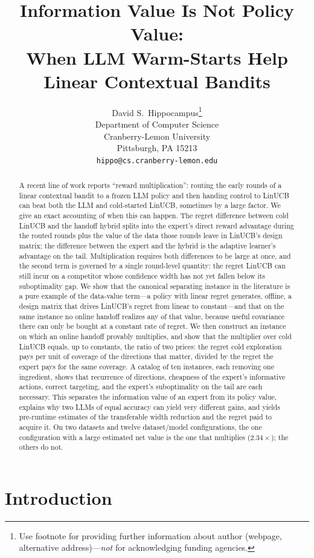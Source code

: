 \documentclass{article}
\title{Information Value Is Not Policy Value:\\ When LLM Warm-Starts Help Linear Contextual Bandits}
\author{%
  David S.~Hippocampus\thanks{Use footnote for providing further information
    about author (webpage, alternative address)---\emph{not} for acknowledging
    funding agencies.} \\
  Department of Computer Science\\
  Cranberry-Lemon University\\
  Pittsburgh, PA 15213 \\
  \texttt{hippo@cs.cranberry-lemon.edu} \\
}
\theoremstyle{definition}
\theoremstyle{remark}
\theoremstyle{remark}
\begin{document}
\maketitle
\begin{abstract}
A recent line of work reports ``reward multiplication'': routing the early
rounds of a linear contextual bandit to a frozen LLM policy and then handing
control to LinUCB can beat both the LLM and cold-started LinUCB, sometimes by a
large factor. We give an exact accounting of when this can happen. The regret
difference between cold LinUCB and the handoff hybrid splits into the expert's
direct reward advantage during the routed rounds plus the value of the data
those rounds leave in LinUCB's design matrix; the difference between the expert
and the hybrid is the adaptive learner's advantage on the tail. Multiplication
requires both differences to be large at once, and the second term is governed
by a single round-level quantity: the regret LinUCB can still incur on a
competitor whose confidence width has not yet fallen below its suboptimality
gap. We show that the canonical separating instance in the literature is a pure
example of the data-value term---a policy with linear regret generates, offline,
a design matrix that drives LinUCB's regret from linear to constant---and that
on the same instance no online handoff realizes any of that value, because
useful covariance there can only be bought at a constant rate of regret. We
then construct an instance on which an online handoff provably multiplies,
and show that the multiplier over cold LinUCB equals, up to constants, the
ratio of two prices: the regret cold exploration pays per unit of coverage
of the directions that matter, divided by the regret the expert pays for the
same coverage. A catalog of ten instances, each removing one ingredient,
shows that recurrence of directions, cheapness of the expert's informative
actions, correct targeting, and the expert's suboptimality on the tail are
each necessary. This separates the information value of an expert from its
policy value, explains
why two LLMs of equal accuracy can yield very different gains, and yields
pre-runtime estimates of the transferable width reduction and the regret paid
to acquire it. On two datasets and twelve dataset/model configurations, the
one configuration with a large estimated net value is the one that multiplies
($2.34\times$); the others do not.
\end{abstract}


\section{Introduction}
\label{sec:intro}
\end{document}
